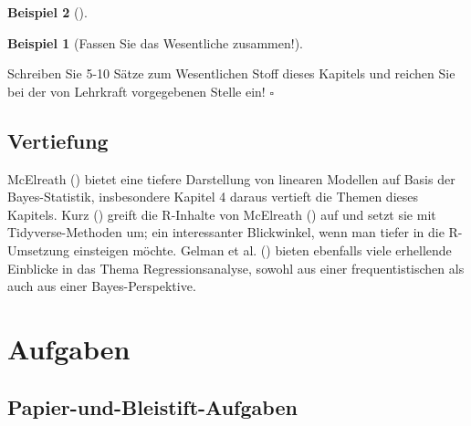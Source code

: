 \documentclass[
  ngerman,
  letterpaper,
  twoside,
  open=any]{scrbook}
\theoremstyle{definition}
\newtheorem{example}{Beispiel}[chapter]
\theoremstyle{plain}
\theoremstyle{definition}
\theoremstyle{definition}
\theoremstyle{remark}
\begin{document}
\begin{example}[]
\begin{example}[Fassen Sie das Wesentliche
zusammen!]\protect\hypertarget{exm-ausstieg-post}{}\label{exm-ausstieg-post}

Schreiben Sie 5-10 Sätze zum Wesentlichen Stoff dieses Kapitels und
reichen Sie bei der von Lehrkraft vorgegebenen Stelle ein! \(\square\)

\end{example}

\subsection{Vertiefung}\label{vertiefung-3}

McElreath () bietet eine tiefere
Darstellung von linearen Modellen auf Basis der Bayes-Statistik,
insbesondere Kapitel 4 daraus vertieft die Themen dieses Kapitels. Kurz
() greift die R-Inhalte von McElreath
() auf und setzt sie mit
Tidyverse-Methoden um; ein interessanter Blickwinkel, wenn man tiefer in
die R-Umsetzung einsteigen möchte. Gelman et al.
() bieten ebenfalls viele erhellende
Einblicke in das Thema Regressionsanalyse, sowohl aus einer
frequentistischen als auch aus einer Bayes-Perspektive.

\section{Aufgaben}\label{aufgaben-8}

\subsection{Papier-und-Bleistift-Aufgaben}\label{papier-und-bleistift-aufgaben-3}


\end{example}
\end{document}
